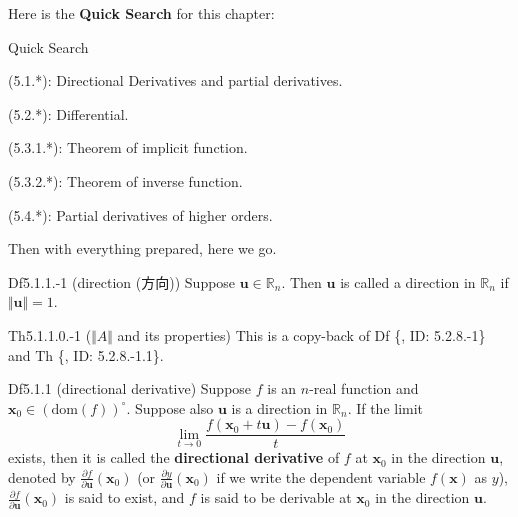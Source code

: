 \documentclass{article}
\newcommand{\parfrac}[2]{\frac{\partial #1}{\partial #2}}
\begin{document}
Here is the \textbf{Quick Search} for this chapter:
\begin{Th}{Quick Search}
    \begin{compactdesc}
        \item (5.1.*): Directional Derivatives and partial derivatives.
        \item (5.2.*): Differential.
        \item (5.3.1.*): Theorem of implicit function.
        \item (5.3.2.*): Theorem of inverse function.
        \item (5.4.*): Partial derivatives of higher orders.
    \end{compactdesc}
\end{Th}

Then with everything prepared, here we go.

\begin{Df}{Df5.1.1.-1 (direction (方向))}
    Suppose $\pmb{u}\in\mathbb{R}_n$. Then $\pmb{u}$ is called a direction in $\mathbb{R}_n$ if $\Vert \pmb{u}\Vert = 1$.
\end{Df}

\begin{Th}{Th5.1.1.0.-1 ($\Vert A\Vert$ and its properties)}
    This is a copy-back of Df \{, ID: 5.2.8.-1\} and Th \{, ID: 5.2.8.-1.1\}.
\end{Th}

\begin{Df}{Df5.1.1 (directional derivative)}
    Suppose $f$ is an $n$-real function and $\pmb{x}_0\in (\text{dom}(f))^\circ$. Suppose also $\pmb{u}$ is a direction in $\mathbb{R}_n$. If the limit
    $$\lim_{t\to 0}\frac{f(\pmb{x}_0 + t\pmb{u}) - f(\pmb{x}_0)}{t}$$ 
    exists, then it is called the \textbf{directional derivative} of $f$ at $\pmb{x}_0$ in the direction $\pmb{u}$, denoted by $\parfrac{f}{\pmb{u}}(\pmb{x}_0)$ (or $\parfrac{y}{\pmb{u}}(\pmb{x}_0)$ if we write the dependent variable $f(\pmb{x})$ as $y$), $\parfrac{f}{\pmb{u}}(\pmb{x}_0)$ is said to exist, and $f$ is said to be derivable at $\pmb{x}_0$ in the direction $\pmb{u}$.
\end{Df}
\end{document}
